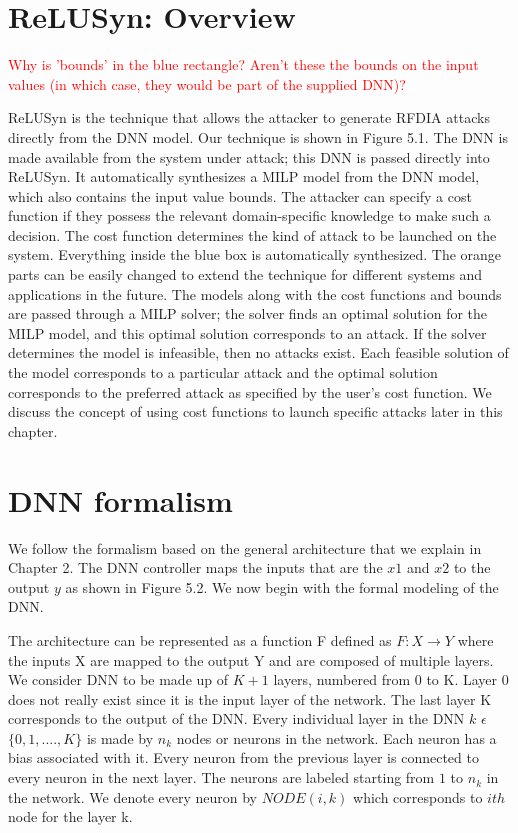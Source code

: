 \section{ReLUSyn: Overview}
\textcolor{red}{Why is 'bounds' in the blue rectangle? Aren't these the bounds on the input values (in which case, they would be part of the supplied DNN)?}

ReLUSyn is the technique that allows the attacker to generate \ac{RFDIA} attacks directly from the \ac{DNN} model. 
Our technique is shown in Figure 5.1.
The \ac{DNN} is made available from the system under attack; this DNN is passed directly into ReLUSyn. 
It automatically synthesizes a \ac{MILP} model from the \ac{DNN} model, which also contains the input value bounds. 
The attacker can specify a cost function if they possess the relevant domain-specific knowledge to make such a decision. The cost function determines the kind of attack to be launched on the system.
Everything inside the blue box is automatically synthesized.
The orange parts can be easily changed to extend the technique for different systems and applications in the future. 
The models along with the cost functions and bounds are passed through a MILP solver; the solver finds an optimal solution for the MILP model, and this optimal solution corresponds to an attack. If the solver determines the model is infeasible, then no attacks exist.
Each feasible solution of the model corresponds to a particular attack and the optimal solution corresponds to the preferred attack as specified by the user's cost function. We discuss the concept of using cost functions to launch specific attacks later in this chapter.

\section{DNN formalism}
We follow the formalism based on the general architecture that we explain in Chapter 2. 
The \ac{DNN} controller maps the inputs that are the $x1$ and $x2$ to the output $y$ as shown in  Figure 5.2.   
We now begin with the formal modeling of the \ac{DNN}.


The architecture can be represented as a function F defined as $F: X \rightarrow Y$ where the inputs X are mapped to the output Y and are composed of multiple layers. 
We consider \ac{DNN} to be made up of $K + 1$ layers, numbered from 0 to K.
Layer 0 does not really exist since it is the input layer of the network.
The last layer K corresponds to the output of the \ac{DNN}.
Every individual layer in the \ac{DNN} $k$ $\epsilon$ $\{0,1,....,K\}$ is made by $n_k$ nodes or neurons in the network.
Each neuron has a bias associated with it. 
Every neuron from the previous layer is connected to every neuron in the next layer. 
The neurons are labeled starting from $1$ to $n_k$ in the network. 
We denote every neuron by $NODE(i,k)$ which corresponds to $ith$ node for the layer k. 

